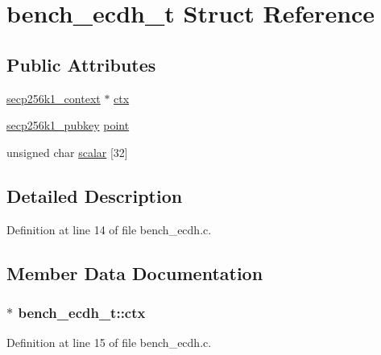 \hypertarget{structbench__ecdh__t}{}\section{bench\+\_\+ecdh\+\_\+t Struct Reference}
\label{structbench__ecdh__t}
\subsection*{Public Attributes}
\begin{DoxyCompactItemize}
\item 
\hyperlink{secp256k1_8h_a282ec9e6dfec8c35955c3eb2f7476e5e}{secp256k1\+\_\+context} $\ast$ \hyperlink{structbench__ecdh__t_a1e080318ae111032a3068748e2a50a57}{ctx}
\item 
\hyperlink{structsecp256k1__pubkey}{secp256k1\+\_\+pubkey} \hyperlink{structbench__ecdh__t_aa2d9806cee2be627fc76ce1bca9dd5e8}{point}
\item 
unsigned char \hyperlink{structbench__ecdh__t_a2641f51e954a515683720afab29009c4}{scalar} \mbox{[}32\mbox{]}
\end{DoxyCompactItemize}


\subsection{Detailed Description}


Definition at line 14 of file bench\+\_\+ecdh.\+c.



\subsection{Member Data Documentation}
\hypertarget{structbench__ecdh__t_a1e080318ae111032a3068748e2a50a57}{}
\subsubsection[{ctx}]{$\ast$ bench\+\_\+ecdh\+\_\+t\+::ctx}\label{structbench__ecdh__t_a1e080318ae111032a3068748e2a50a57}


Definition at line 15 of file bench\+\_\+ecdh.\+c.

\hypertarget{structbench__ecdh__t_aa2d9806cee2be627fc76ce1bca9dd5e8}{}
